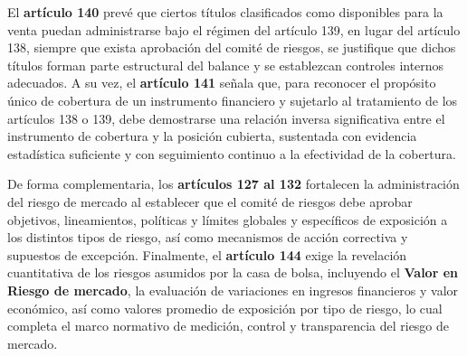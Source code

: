 El \textbf{artículo 140} prevé que ciertos títulos clasificados como disponibles para la venta puedan administrarse bajo el régimen del artículo 139, en lugar del artículo 138, siempre que exista aprobación del comité de riesgos, se justifique que dichos títulos forman parte estructural del balance y se establezcan controles internos adecuados. A su vez, el \textbf{artículo 141} señala que, para reconocer el propósito único de cobertura de un instrumento financiero y sujetarlo al tratamiento de los artículos 138 o 139, debe demostrarse una relación inversa significativa entre el instrumento de cobertura y la posición cubierta, sustentada con evidencia estadística suficiente y con seguimiento continuo a la efectividad de la cobertura.

De forma complementaria, los \textbf{artículos 127 al 132} fortalecen la administración del riesgo de mercado al establecer que el comité de riesgos debe aprobar objetivos, lineamientos, políticas y límites globales y específicos de exposición a los distintos tipos de riesgo, así como mecanismos de acción correctiva y supuestos de excepción. Finalmente, el \textbf{artículo 144} exige la revelación cuantitativa de los riesgos asumidos por la casa de bolsa, incluyendo el \textbf{Valor en Riesgo de mercado}, la evaluación de variaciones en ingresos financieros y valor económico, así como valores promedio de exposición por tipo de riesgo, lo cual completa el marco normativo de medición, control y transparencia del riesgo de mercado.
